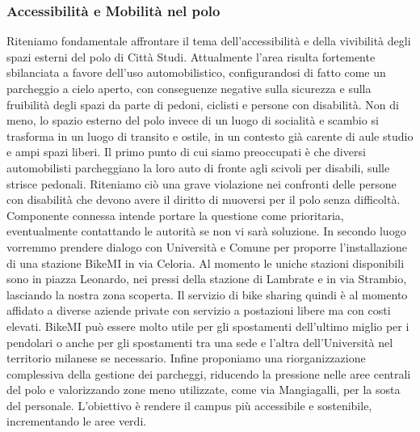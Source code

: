 \documentclass[12pt,a4paper]{article}
\begin{document}
\subsubsection{Accessibilità e Mobilità nel polo}

Riteniamo fondamentale affrontare il tema dell’accessibilità e della vivibilità
degli spazi esterni del polo di Città Studi. Attualmente l’area risulta
fortemente sbilanciata a favore dell’uso automobilistico, configurandosi di
fatto come un parcheggio a cielo aperto, con conseguenze negative sulla
sicurezza e sulla fruibilità degli spazi da parte di pedoni, ciclisti e persone
con disabilità. Non di meno, lo spazio esterno del polo invece di un luogo di
socialità e scambio si trasforma in un luogo di transito e ostile, in un
contesto già carente di aule studio e ampi spazi liberi.
Il primo punto di cui siamo preoccupati è che diversi automobilisti parcheggiano
la loro auto di fronte agli scivoli per disabili, sulle strisce pedonali.
Riteniamo ciò una grave violazione nei confronti delle persone con disabilità
che devono avere il diritto di muoversi per il polo senza difficoltà. Componente
connessa intende portare la questione come prioritaria, eventualmente
contattando le autorità se non vi sarà soluzione.
In secondo luogo vorremmo prendere dialogo con Università e Comune per proporre
l'installazione di una stazione BikeMI in via Celoria. Al momento le uniche
stazioni disponibili sono in piazza Leonardo, nei pressi della stazione di
Lambrate e in via Strambio, lasciando la nostra zona scoperta. Il servizio di
bike sharing quindi è al momento affidato a diverse aziende private con servizio
a postazioni libere ma con costi elevati. BikeMI può essere molto utile per gli
spostamenti dell'ultimo miglio per i pendolari o anche per gli spostamenti tra
una sede e l'altra dell'Università nel territorio milanese se necessario.
Infine proponiamo una riorganizzazione complessiva della gestione dei parcheggi,
riducendo la pressione nelle aree centrali del polo e valorizzando zone meno
utilizzate, come via Mangiagalli, per la sosta del personale. L’obiettivo è
rendere il campus più accessibile e sostenibile, incrementando le aree verdi.
\end{document}
